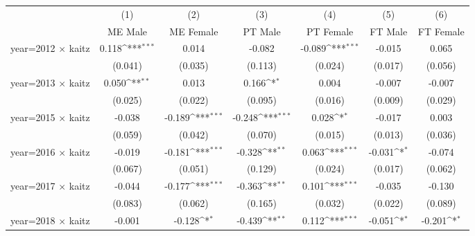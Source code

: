 {
\def\sym#1{\ifmmode^{#1}\else\(^{#1}\)\fi}
\begin{tabular}{l*{6}{c}}
\hline\hline
                    &\multicolumn{1}{c}{(1)}&\multicolumn{1}{c}{(2)}&\multicolumn{1}{c}{(3)}&\multicolumn{1}{c}{(4)}&\multicolumn{1}{c}{(5)}&\multicolumn{1}{c}{(6)}\\
                    &\multicolumn{1}{c}{ME Male}&\multicolumn{1}{c}{ME Female}&\multicolumn{1}{c}{PT Male}&\multicolumn{1}{c}{PT Female}&\multicolumn{1}{c}{FT Male}&\multicolumn{1}{c}{FT Female}\\
\hline
year=2012 $\times$ kaitz&       0.118\sym{***}&       0.014         &      -0.082         &      -0.089\sym{***}&      -0.015         &       0.065         \\
                    &     (0.041)         &     (0.035)         &     (0.113)         &     (0.024)         &     (0.017)         &     (0.056)         \\
[1em]
year=2013 $\times$ kaitz&       0.050\sym{**} &       0.013         &       0.166\sym{*}  &       0.004         &      -0.007         &      -0.007         \\
                    &     (0.025)         &     (0.022)         &     (0.095)         &     (0.016)         &     (0.009)         &     (0.029)         \\
[1em]
year=2015 $\times$ kaitz&      -0.038         &      -0.189\sym{***}&      -0.248\sym{***}&       0.028\sym{*}  &      -0.017         &       0.003         \\
                    &     (0.059)         &     (0.042)         &     (0.070)         &     (0.015)         &     (0.013)         &     (0.036)         \\
[1em]
year=2016 $\times$ kaitz&      -0.019         &      -0.181\sym{***}&      -0.328\sym{**} &       0.063\sym{***}&      -0.031\sym{*}  &      -0.074         \\
                    &     (0.067)         &     (0.051)         &     (0.129)         &     (0.024)         &     (0.017)         &     (0.062)         \\
[1em]
year=2017 $\times$ kaitz&      -0.044         &      -0.177\sym{***}&      -0.363\sym{**} &       0.101\sym{***}&      -0.035         &      -0.130         \\
                    &     (0.083)         &     (0.062)         &     (0.165)         &     (0.032)         &     (0.022)         &     (0.089)         \\
[1em]
year=2018 $\times$ kaitz&      -0.001         &      -0.128\sym{*}  &      -0.439\sym{**} &       0.112\sym{***}&      -0.051\sym{*}  &      -0.201\sym{*}  \\

\end{tabular}}
